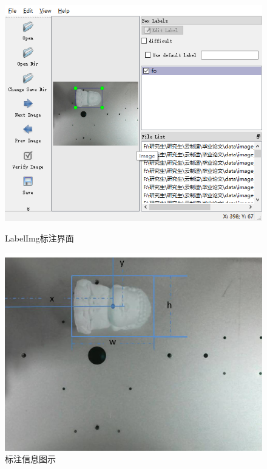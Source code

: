 \begin{figure}[h]
    \begin{minipage}{0.5\linewidth}
        \centering
        \includegraphics[scale=0.5]{pic/chap3/labelimg.jpg}
        \caption{LabelImg标注界面}
        \label{fig:LabelImg}
    \end{minipage}
    \begin{minipage}{0.5\linewidth}
        \centering
        \includegraphics[scale=0.5]{pic/chap3/标注信息图示.jpg}
        \caption{标注信息图示}
        \label{fig:labelimg_info}
    \end{minipage}
\end{figure}

